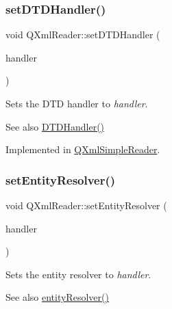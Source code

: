 \mbox{\label{class_q_xml_reader_a0b24b1fe26a4c32a8032d68ee14d5dba}} 
\subsubsection{\texorpdfstring{setDTDHandler()}{setDTDHandler()}}
{\footnotesize\ttfamily void Q\+Xml\+Reader\+::set\+D\+T\+D\+Handler (\begin{DoxyParamCaption}\item[{\mbox{\hyperlink{class_q_xml_d_t_d_handler}{Q\+Xml\+D\+T\+D\+Handler}} $\ast$}]{handler }\end{DoxyParamCaption})\hspace{0.3cm}{\ttfamily [pure virtual]}}

Sets the D\+TD handler to {\itshape handler}.

\begin{DoxySeeAlso}{See also}
\mbox{\hyperlink{class_q_xml_reader_a5c40696cea43c1af838e575b7cf7921c}{D\+T\+D\+Handler()}} 
\end{DoxySeeAlso}


Implemented in \mbox{\hyperlink{class_q_xml_simple_reader_a48b3b2f31a8e0436049fa13072b3bec7}{Q\+Xml\+Simple\+Reader}}.

\mbox{\label{class_q_xml_reader_a82a810f10ac48cf35d698f57bc2d4647}} 
\subsubsection{\texorpdfstring{setEntityResolver()}{setEntityResolver()}}
{\footnotesize\ttfamily void Q\+Xml\+Reader\+::set\+Entity\+Resolver (\begin{DoxyParamCaption}\item[{\mbox{\hyperlink{class_q_xml_entity_resolver}{Q\+Xml\+Entity\+Resolver}} $\ast$}]{handler }\end{DoxyParamCaption})\hspace{0.3cm}{\ttfamily [pure virtual]}}

Sets the entity resolver to {\itshape handler}.

\begin{DoxySeeAlso}{See also}
\mbox{\hyperlink{class_q_xml_reader_ad16d14b4da2560aa3f32ea754d8d1104}{entity\+Resolver()}} 
\end{DoxySeeAlso}


